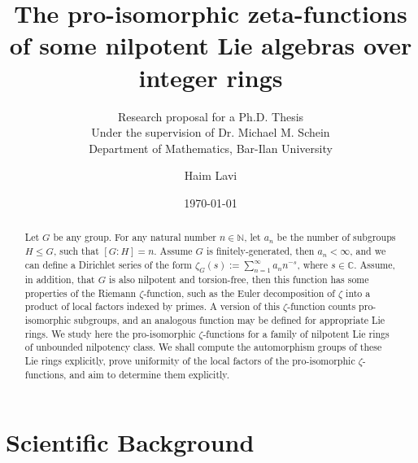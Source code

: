 \documentclass[12pt]{article}
\title{The pro-isomorphic zeta-functions of some nilpotent Lie algebras over integer rings}
\subtitle{Research proposal for a Ph.D. Thesis\\
Under the supervision of Dr. Michael M. Schein\\
Department of Mathematics, Bar-Ilan University}
\author{Haim Lavi}
\date{\today}
\begin{document}
\maketitle
\newpage
\tableofcontents
\newpage
\begin{abstract}
Let $G$ be any group. For any natural number $n\in\mathbb{N}$, let $a_n$ be the number of subgroups $H\leq G$, such that $[G:H]=n$. Assume $G$ is finitely-generated, then $a_n<\infty$, and we can define a Dirichlet series of the form $\zeta_G(s):=\sum_{n=1}^\infty a_n n^{-s}$, where $s\in\mathbb{C}$. Assume, in addition, that $G$ is also nilpotent and torsion-free, then this function has some properties of the Riemann $\zeta$-function, such as the Euler decomposition of $\zeta$ into a product of local factors indexed by primes. A version of this $\zeta$-function counts pro-isomorphic subgroups, and an analogous function may be defined for appropriate Lie rings. We study here the pro-isomorphic $\zeta$-functions for a family of nilpotent Lie rings of unbounded nilpotency class. We shall compute the automorphism groups of these Lie rings explicitly, prove uniformity of the local factors of the pro-isomorphic $\zeta$-functions, and aim to determine them explicitly.
\end{abstract}
\section{Scientific Background}
\end{document}
